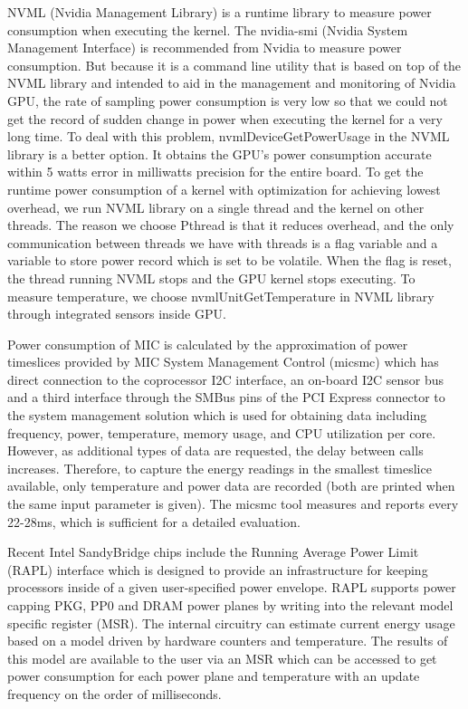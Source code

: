 NVML (Nvidia Management Library) \cite{R:16} is a runtime library to measure power consumption when executing the kernel. The nvidia-smi (Nvidia System Management Interface) is recommended from Nvidia to measure power consumption. But because it is a command line utility that is based on top of the NVML library and intended to aid in the management and monitoring of Nvidia GPU, the rate of sampling power consumption is very low so that we could not get the record of sudden change in power when executing the kernel for a very long time. To deal with this problem, nvmlDeviceGetPowerUsage in the NVML library is a better option. It obtains the GPU's power consumption accurate within 5 watts error in milliwatts precision for the entire board. 
To get the runtime power consumption of a kernel with optimization for achieving lowest overhead, we run NVML library on a single thread and the kernel on other threads. The reason we choose Pthread is that it reduces overhead, and the only communication between threads we have with threads is a flag variable and a variable to store power record which is set to be volatile. When the flag is reset, the thread running NVML stops and the GPU kernel stops executing. To measure temperature, we choose nvmlUnitGetTemperature in NVML library through integrated sensors inside GPU.

 Power consumption of MIC is calculated by the approximation of power timeslices provided by MIC System Management Control (micsmc) \cite{R:17} which has direct connection to the coprocessor I2C interface, an on-board I2C sensor bus and a third interface through the SMBus pins of the PCI Express connector to the system management solution which is used for obtaining data including frequency, power, temperature, memory usage, and CPU utilization per core. However, as additional types of data are requested, the delay between calls increases. Therefore, to capture the energy readings in the smallest timeslice available, only temperature and power data are recorded (both are printed when the same input parameter is given). The micsmc tool measures and reports every 22-28ms, which is sufficient for a detailed evaluation. 


 Recent Intel SandyBridge chips include the Running Average Power Limit (RAPL) interface \cite{R:15} which is designed to provide an infrastructure for keeping processors inside of a given user-specified power envelope. RAPL supports power capping PKG, PP0 and DRAM power planes by writing into the relevant model specific register (MSR). The internal circuitry can estimate current energy usage based on a model driven by hardware counters and temperature. The results of this model are available to the user via an MSR which can be accessed to get power consumption for each power plane and temperature with an update frequency on the order of milliseconds. 




